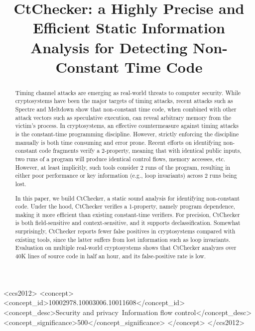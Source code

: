 \documentclass[sigconf, authorversion]{acmart}
\newcommand{\sysname}{CtChecker}
\begin{document}
\title{\sysname: a Highly Precise and Efficient Static Information Analysis for
Detecting Non-Constant Time Code}





\begin{abstract}
Timing channel attacks are emerging as real-world threats to computer security.
While cryptosystems have been the major targets of timing attacks, recent
attacks such as Spectre and Meltdown show that non-constant time code, when
combined with other attack vectors such as speculative execution, can reveal
arbitrary memory from the victim's process.  In cryptosystems, an effective
countermeasure against timing attacks is the constant-time programming
discipline. However, strictly enforcing the discipline manually is both time
consuming and error prone. Recent efforts on identifying non-constant code
fragments verify a 2-property, meaning that with identical public inputs, two
runs of a program will produce identical control flows, memory accesses, etc.
However, at least implicitly, such tools consider 2 runs of the program,
resulting in either poor performance or key information (e.g., loop invariants)
across 2 runs being lost.

In this paper, we build \sysname, a static sound analysis for identifying
non-constant code. Under the hood, \sysname{} verifies a 1-property, namely
program dependence, making it more efficient than existing constant-time
verifiers. For precision, \sysname{} is both field-sensitive and
context-sensitive, and it supports declassification. Somewhat surprisingly,
\sysname{} reports fewer false positives in cryptosystems compared with
existing tools, since the latter suffers from lost information such as loop
invariants. Evaluation on multiple real-world cryptosystems shows that
\sysname{} analyzes over 40K lines of source code in half an hour, and its
false-positive rate is low.
\end{abstract}


%
%
 \begin{CCSXML}
<ccs2012>
<concept>
<concept_id>10002978.10003006.10011608</concept_id>
<concept_desc>Security and privacy~Information flow control</concept_desc>
<concept_significance>500</concept_significance>
</concept>
</ccs2012>
\end{CCSXML}
\end{document}
